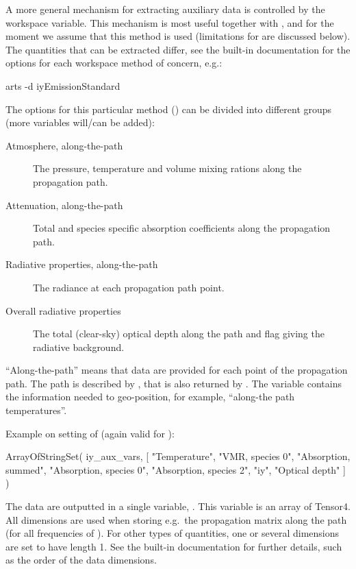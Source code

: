 A more general mechanism for extracting auxiliary data is controlled by the
 workspace variable. This mechanism is most useful
together with , and for the moment we assume that this
method is used (limitations for  are discussed below). The
quantities that can be extracted differ, see the built-in documentation for
the options for each workspace method of concern, e.g.:
\begin{code}
arts -d iyEmissionStandard
\end{code}
The options for this particular method  () can be
divided into different groups (more variables will/can be added):
\begin{description}
\item[Atmosphere, along-the-path] The pressure, temperature and volume mixing
  rations along the propagation path.
\item[Attenuation, along-the-path] Total and species specific absorption
  coefficients along the propagation path.
\item[Radiative properties, along-the-path] The radiance at each propagation
  path point.
\item[Overall radiative properties] The total (clear-sky) optical depth along
  the path and flag giving the radiative background.
\end{description}
``Along-the-path'' means that data are provided for each point of the
propagation path. The path is described by , that is also
returned by . The  variable
contains the information needed to geo-position, for example, ``along-the path
temperatures''. 

Example on setting of  (again valid for
):
\begin{code}
ArrayOfStringSet( iy_aux_vars,  
    [ "Temperature", 
      "VMR, species 0",
      "Absorption, summed", 
      "Absorption, species 0",
      "Absorption, species 2",
      "iy", 
      "Optical depth" ] )
\end{code}
The data are outputted in a single variable, . This variable
is an array of Tensor4. All dimensions are used when storing e.g.\ the
propagation matrix along the path (for all frequencies of
). For other types of quantities, one or several dimensions
are set to have length 1. See the built-in documentation for further details,
such as the order of the data dimensions.

